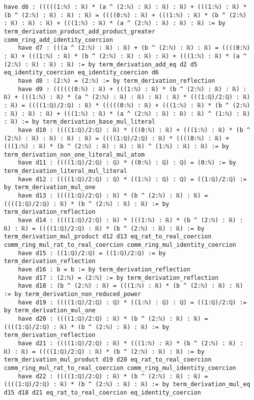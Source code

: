 \documentclass{article}
\begin{document}
\begin{tcolorbox}[colback=white!10, width=\linewidth]
\begin{lstlisting}[language=Lean4]
    have d6 : (((((1:ℕ) : ℝ) * (a ^ (2:ℕ) : ℝ) : ℝ) : ℝ) + (((1:ℕ) : ℝ) * (b ^ (2:ℕ) : ℝ) : ℝ) : ℝ) = ((((0:ℕ) : ℝ) + (((1:ℕ) : ℝ) * (b ^ (2:ℕ) : ℝ) : ℝ) : ℝ) + (((1:ℕ) : ℝ) * (a ^ (2:ℕ) : ℝ) : ℝ) : ℝ) := by term_derivation_product_add_product_greater comm_ring_add_identity_coercion
    have d7 : (((a ^ (2:ℕ) : ℝ) : ℝ) + (b ^ (2:ℕ) : ℝ) : ℝ) = ((((0:ℕ) : ℝ) + (((1:ℕ) : ℝ) * (b ^ (2:ℕ) : ℝ) : ℝ) : ℝ) + (((1:ℕ) : ℝ) * (a ^ (2:ℕ) : ℝ) : ℝ) : ℝ) := by term_derivation_add_eq d2 d5 eq_identity_coercion eq_identity_coercion d6
    have d8 : (2:ℕ) = (2:ℕ) := by term_derivation_reflection
    have d9 : ((((((0:ℕ) : ℝ) + (((1:ℕ) : ℝ) * (b ^ (2:ℕ) : ℝ) : ℝ) : ℝ) + (((1:ℕ) : ℝ) * (a ^ (2:ℕ) : ℝ) : ℝ) : ℝ) : ℝ) * (((1:ℚ)/2:ℚ) : ℝ) : ℝ) = ((((1:ℚ)/2:ℚ) : ℝ) * (((((0:ℕ) : ℝ) + (((1:ℕ) : ℝ) * (b ^ (2:ℕ) : ℝ) : ℝ) : ℝ) + (((1:ℕ) : ℝ) * (a ^ (2:ℕ) : ℝ) : ℝ) : ℝ) ^ (1:ℕ) : ℝ) : ℝ) := by term_derivation_base_mul_literal
    have d10 : ((((1:ℚ)/2:ℚ) : ℝ) * (((0:ℕ) : ℝ) + (((1:ℕ) : ℝ) * (b ^ (2:ℕ) : ℝ) : ℝ) : ℝ) : ℝ) = ((((1:ℚ)/2:ℚ) : ℝ) * ((((0:ℕ) : ℝ) + (((1:ℕ) : ℝ) * (b ^ (2:ℕ) : ℝ) : ℝ) : ℝ) ^ (1:ℕ) : ℝ) : ℝ) := by term_derivation_non_one_literal_mul_atom
    have d11 : ((((1:ℚ)/2:ℚ) : ℚ) * ((0:ℕ) : ℚ) : ℚ) = (0:ℕ) := by term_derivation_literal_mul_literal
    have d12 : ((((1:ℚ)/2:ℚ) : ℚ) * ((1:ℕ) : ℚ) : ℚ) = ((1:ℚ)/2:ℚ) := by term_derivation_mul_one
    have d13 : ((((1:ℚ)/2:ℚ) : ℝ) * (b ^ (2:ℕ) : ℝ) : ℝ) = ((((1:ℚ)/2:ℚ) : ℝ) * (b ^ (2:ℕ) : ℝ) : ℝ) := by term_derivation_reflection
    have d14 : ((((1:ℚ)/2:ℚ) : ℝ) * (((1:ℕ) : ℝ) * (b ^ (2:ℕ) : ℝ) : ℝ) : ℝ) = ((((1:ℚ)/2:ℚ) : ℝ) * (b ^ (2:ℕ) : ℝ) : ℝ) := by term_derivation_mul_product d12 d13 eq_rat_to_real_coercion comm_ring_mul_rat_to_real_coercion comm_ring_mul_identity_coercion
    have d15 : ((1:ℚ)/2:ℚ) = ((1:ℚ)/2:ℚ) := by term_derivation_reflection
    have d16 : b = b := by term_derivation_reflection
    have d17 : (2:ℕ) = (2:ℕ) := by term_derivation_reflection
    have d18 : (b ^ (2:ℕ) : ℝ) = (((1:ℕ) : ℝ) * (b ^ (2:ℕ) : ℝ) : ℝ) := by term_derivation_non_reduced_power
    have d19 : ((((1:ℚ)/2:ℚ) : ℚ) * ((1:ℕ) : ℚ) : ℚ) = ((1:ℚ)/2:ℚ) := by term_derivation_mul_one
    have d20 : ((((1:ℚ)/2:ℚ) : ℝ) * (b ^ (2:ℕ) : ℝ) : ℝ) = ((((1:ℚ)/2:ℚ) : ℝ) * (b ^ (2:ℕ) : ℝ) : ℝ) := by term_derivation_reflection
    have d21 : ((((1:ℚ)/2:ℚ) : ℝ) * (((1:ℕ) : ℝ) * (b ^ (2:ℕ) : ℝ) : ℝ) : ℝ) = ((((1:ℚ)/2:ℚ) : ℝ) * (b ^ (2:ℕ) : ℝ) : ℝ) := by term_derivation_mul_product d19 d20 eq_rat_to_real_coercion comm_ring_mul_rat_to_real_coercion comm_ring_mul_identity_coercion
    have d22 : ((((1:ℚ)/2:ℚ) : ℝ) * (b ^ (2:ℕ) : ℝ) : ℝ) = ((((1:ℚ)/2:ℚ) : ℝ) * (b ^ (2:ℕ) : ℝ) : ℝ) := by term_derivation_mul_eq d15 d18 d21 eq_rat_to_real_coercion eq_identity_coercion

\end{lstlisting}
\end{tcolorbox}
\end{document}
